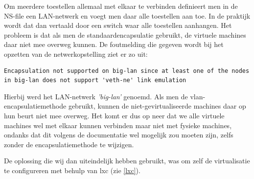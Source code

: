 Om meerdere toestellen allemaal met elkaar te verbinden definieert men in de NS-file een LAN-netwerk en voegt men daar alle toestellen aan toe.
In de praktijk wordt dat dan vertaald door een switch waar alle toestellen aanhangen.
Het probleem is dat als men de standaardencapsulatie gebruikt, de virtuele machines daar niet mee overweg kunnen.
De foutmelding die gegeven wordt bij het opzetten van de netwerkopstelling ziet er zo uit:

\begin{lstlisting}
Encapsulation not supported on big-lan since at least one of the nodes in big-lan does not support 'veth-ne' link emulation
\end{lstlisting}

Hierbij werd het LAN-netwerk \textit{'big-lan'} genoemd.
Als men de vlan-encapsulatiemethode gebruikt, kunnen de niet-gevirtualiseerde machines daar op hun beurt niet mee overweg.
Het komt er dus op neer dat we alle virtuele machines wel met elkaar kunnen verbinden maar niet met fysieke machines,
ondanks dat dit volgens de documentatie wel mogelijk zou moeten zijn, zelfs zonder de encapsulatiemethode te wijzigen\cite{vwall-openvz}.

De oplossing die wij dan uiteindelijk hebben gebruikt, was om zelf de virtualisatie te configureren met behulp van \gls{lxc} (zie \cref{lxc}).


